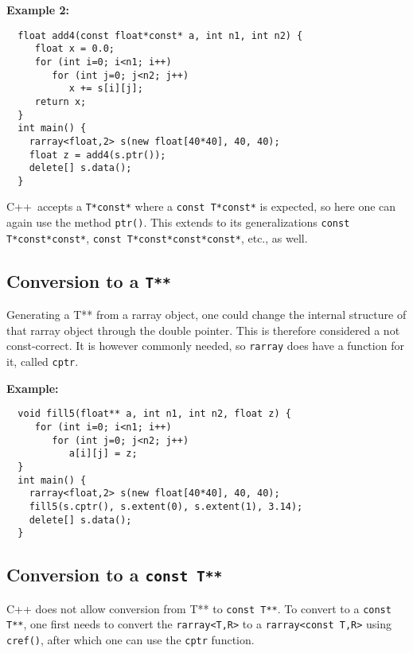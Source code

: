 \documentclass[12pt,twoside]{article}
\newcommand{\cxx}{C{++}}
\begin{document}
\noindent
{\bf Example 2:}
\vspace{-5pt}\begin{framed}\vspace{-14pt}%
\begin{verbatim}
  float add4(const float*const* a, int n1, int n2) {
     float x = 0.0;
     for (int i=0; i<n1; i++)
        for (int j=0; j<n2; j++)
           x += s[i][j];
     return x;
  }
  int main() {
    rarray<float,2> s(new float[40*40], 40, 40);
    float z = add4(s.ptr());
    delete[] s.data();
  }
\end{verbatim}\vspace{-14pt}
\end{framed}

\noindent
\cxx\ accepts a \texttt{T*const*} where a \texttt{const T*const*} is expected, so here one can again use the method \texttt{ptr()}.
This extends to its generalizations \texttt{const T*const*const*}, \texttt{const T*const*const*const*}, etc., as well.


\subsection{Conversion to a {\tt T**}}

\noindent
Generating a T** from a rarray object, one could change the internal structure of that rarray object through the double pointer.  This is therefore considered a not const-correct.  It is however commonly needed, so \texttt{rarray} does have a function for it, called \texttt{cptr}. 

\noindent
{\bf Example:}
\vspace{-5pt}\begin{framed}\vspace{-14pt}%
\begin{verbatim}
  void fill5(float** a, int n1, int n2, float z) {
     for (int i=0; i<n1; i++)
        for (int j=0; j<n2; j++)
           a[i][j] = z;
  }
  int main() {
    rarray<float,2> s(new float[40*40], 40, 40);
    fill5(s.cptr(), s.extent(0), s.extent(1), 3.14);
    delete[] s.data();
  }
\end{verbatim}\vspace{-14pt}
\end{framed}

\subsection{Conversion to a {\tt const T**}}
\noindent
C++ does not allow conversion from T** to \texttt{const T**}. To convert to a \texttt{const T**}, one first needs to convert the \texttt{rarray{\tt<}T,R{\tt>}} to a \texttt{rarray{\tt<}const T,R{\tt>}} using \texttt{cref()}, after which one can use the \texttt{cptr} function.
\end{document}
